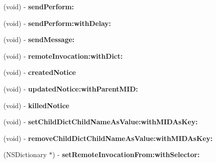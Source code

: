 \begin{DoxyCompactItemize}
\item 
\hypertarget{interface_messenger_system_a60cbd00cd24aa502aa77d86e4391a1b7}{
(void) -\/ {\bfseries sendPerform:}}
\label{dc/dc9/interface_messenger_system_a60cbd00cd24aa502aa77d86e4391a1b7}

\item 
\hypertarget{interface_messenger_system_a12e9a8d84b6cb12f55bf7453166cfab1}{
(void) -\/ {\bfseries sendPerform:withDelay:}}
\label{dc/dc9/interface_messenger_system_a12e9a8d84b6cb12f55bf7453166cfab1}

\item 
\hypertarget{interface_messenger_system_a0938a6c892b3a634870238b4555dc921}{
(void) -\/ {\bfseries sendMessage:}}
\label{dc/dc9/interface_messenger_system_a0938a6c892b3a634870238b4555dc921}

\item 
\hypertarget{interface_messenger_system_a51502df160822ba7c6fd754fdc6353de}{
(void) -\/ {\bfseries remoteInvocation:withDict:}}
\label{dc/dc9/interface_messenger_system_a51502df160822ba7c6fd754fdc6353de}

\item 
\hypertarget{interface_messenger_system_a7e77f9abb100c6123caaa291d7f92ffb}{
(void) -\/ {\bfseries createdNotice}}
\label{dc/dc9/interface_messenger_system_a7e77f9abb100c6123caaa291d7f92ffb}

\item 
\hypertarget{interface_messenger_system_a28703ac96f244da4d7c62207cf65ff69}{
(void) -\/ {\bfseries updatedNotice:withParentMID:}}
\label{dc/dc9/interface_messenger_system_a28703ac96f244da4d7c62207cf65ff69}

\item 
\hypertarget{interface_messenger_system_a127cce35cc1c079fed1bceecccf23a66}{
(void) -\/ {\bfseries killedNotice}}
\label{dc/dc9/interface_messenger_system_a127cce35cc1c079fed1bceecccf23a66}

\item 
\hypertarget{interface_messenger_system_a57dd4208efc5d477c50c5c5f55fe7ff1}{
(void) -\/ {\bfseries setChildDictChildNameAsValue:withMIDAsKey:}}
\label{dc/dc9/interface_messenger_system_a57dd4208efc5d477c50c5c5f55fe7ff1}

\item 
\hypertarget{interface_messenger_system_aadeb829f6e394bbc36d77593ed6fe677}{
(void) -\/ {\bfseries removeChildDictChildNameAsValue:withMIDAsKey:}}
\label{dc/dc9/interface_messenger_system_aadeb829f6e394bbc36d77593ed6fe677}

\item 
\hypertarget{interface_messenger_system_a60c9a5dc9cf6d420d944edead0c957d8}{
(NSDictionary $\ast$) -\/ {\bfseries setRemoteInvocationFrom:withSelector:}}
\label{dc/dc9/interface_messenger_system_a60c9a5dc9cf6d420d944edead0c957d8}


\end{DoxyCompactItemize}
